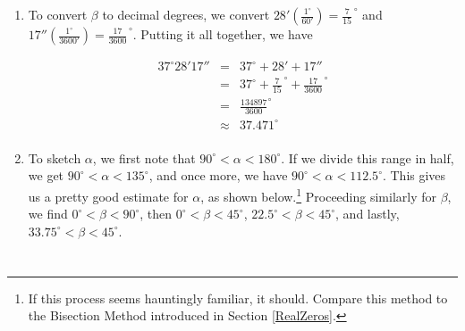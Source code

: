 \documentclass[12pt]{ximera}
\begin{document}
\begin{example}
\begin{enumerate}
\item  To convert $\beta$ to decimal degrees, we convert $28' \left(\frac{1^{\circ}}{60'}\right) = \frac{7}{15}^{\, \circ}$ and $17''\left(\frac{1^{\circ}}{3600'}\right) = \frac{17}{3600}^{\, \circ}$.  Putting it all together, we have

\[ \begin{array}{rcl}

 37^{\circ}28'17'' & = & 37^{\circ} + 28' + 17'' \\ [5pt]
                   & = & 37^{\circ} +  \frac{7}{15}^{\, \circ} + \frac{17}{3600}^{\, \circ} \\ [5pt]
                   & = & \frac{134897}{3600}^{\circ} \\ [5pt]
                   & \approx & 37.471^{\circ} \\ \end{array} \]

\item  To sketch $\alpha$, we first note that $90^{\circ} < \alpha < 180^{\circ}$.  If we divide this range in half, we get $90^{\circ} < \alpha < 135^{\circ}$, and once more, we have $90^{\circ} < \alpha < 112.5^{\circ}$.  This gives us a pretty good estimate for $\alpha$, as shown below.\footnote{If this process seems hauntingly familiar, it should. Compare this method to the Bisection Method introduced in Section \ref{RealZeros}.}  Proceeding similarly for $\beta$, we find $0^{\circ} < \beta < 90^{\circ}$, then $0^{\circ} < \beta < 45^{\circ}$, $22.5^{\circ} < \beta < 45^{\circ}$, and lastly, $33.75^{\circ} < \beta < 45^{\circ}$.  

\[ \begin{array}{cc}

 

&

\hspace{1in}

  \\ \end{array} \]


\end{enumerate}
\end{example}
\end{document}
